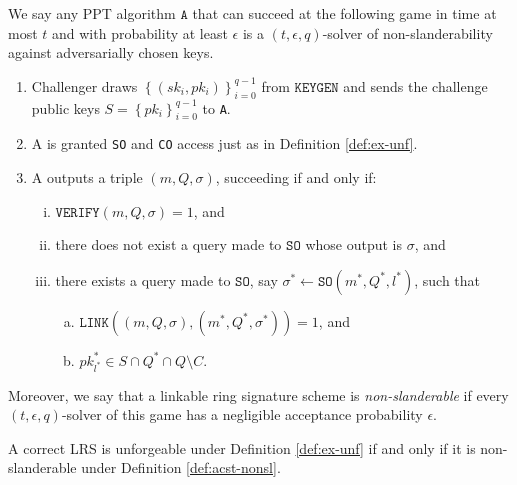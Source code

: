 \documentclass{llncs}
\newcommand{\A}{\texttt{A}}
\begin{document}
\begin{definition}\label{def:acst-nonsl}
We say any PPT algorithm $\A$ that can succeed at the following game in time at most $t$ and with probability at least $\epsilon$ is a $(t, \epsilon, q)$-solver of non-slanderability against adversarially chosen keys.
\begin{enumerate}
\item Challenger draws $\left\{(sk_i, pk_i)\right\}_{i=0}^{q-1}$ from $\texttt{KEYGEN}$ and sends the challenge public keys $S = \left\{pk_i\right\}_{i=0}^{q-1}$ to \A.

\item A is granted \texttt{SO} and \texttt{CO} access just as in Definition \ref{def:ex-unf}.

\item A outputs a triple $(m, Q, \sigma)$, succeeding if and only if:
    \begin{enumerate}[(i)]
    \item $\texttt{VERIFY}(m, Q, \sigma) = 1$, and

    \item there does not exist a query made to $\texttt{SO}$ whose output is $\sigma$, and

    \item there exists a query made to $\texttt{SO}$, say $\sigma^* \leftarrow \texttt{SO}(m^*, Q^*, l^*)$, such that
        \begin{enumerate}[(a)]
        \item $\texttt{LINK}((m, Q, \sigma), (m^*, Q^*, \sigma^*)) = 1$, and

        \item $pk^*_{l^*} \in S \cap Q^* \cap Q \setminus C$.
        \end{enumerate}
    \end{enumerate}
\end{enumerate}
Moreover, we say that a linkable ring signature scheme is \textit{non-slanderable} if every $(t, \epsilon, q)$-solver of this game has a negligible acceptance probability $\epsilon$.
\end{definition}

\begin{theorem}\label{thm:nonsl-implies-unf}
A correct LRS is unforgeable under Definition \ref{def:ex-unf} if and only if it is non-slanderable under Definition \ref{def:acst-nonsl}.
\end{theorem}
\end{document}

